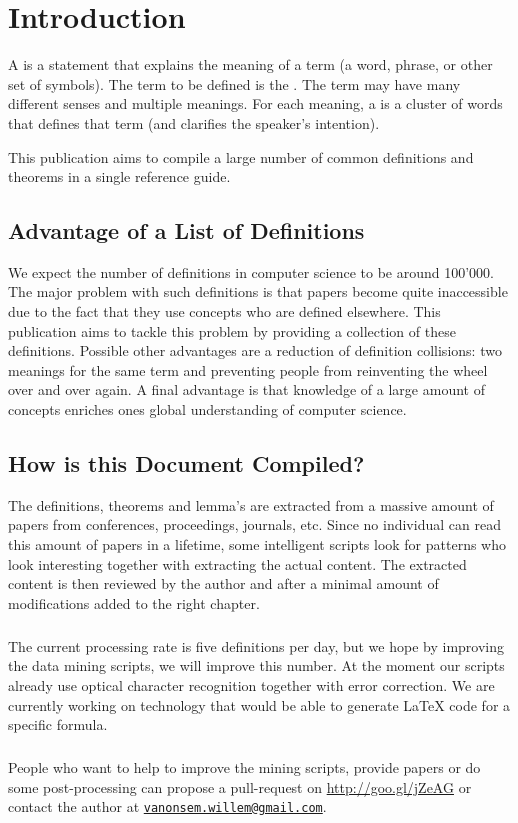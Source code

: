 \chapter*{Introduction}

\begin{defi}
A  is a statement that explains the meaning of a term (a word, phrase, or other set of symbols). The term to be defined is the . The term may have many different senses and multiple meanings. For each meaning, a  is a cluster of words that defines that term (and clarifies the speaker's intention).
\cite{wiki:definition}
\end{defi}

This publication aims to compile a large number of common definitions and theorems in a single reference guide.

\section*{Advantage of a List of Definitions}

We expect the number of definitions in computer science to be around 100'000. The major problem with such definitions is that papers become quite inaccessible due to the fact that they use concepts who are defined elsewhere. This publication aims to tackle this problem by providing a collection of these definitions. Possible other advantages are a reduction of definition collisions: two meanings for the same term and preventing people from reinventing the wheel over and over again. A final advantage is that knowledge of a large amount of concepts enriches ones global understanding of computer science.

\section*{How is this Document Compiled?}

The definitions, theorems and lemma's are extracted from a massive amount of papers from conferences, proceedings, journals, etc. Since no individual can read this amount of papers in a lifetime, some intelligent scripts look for patterns who look interesting together with extracting the actual content. The extracted content is then reviewed by the author and after a minimal amount of modifications added to the right chapter.
\paragraph{}
The current processing rate is five definitions per day, but we hope by improving the data mining scripts, we will improve this number. At the moment our scripts already use optical character recognition together with error correction. We are currently working on technology that would be able to generate \LaTeX{} code for a specific formula.
\paragraph{}
People who want to help to improve the mining scripts, provide papers or do some post-processing can propose a pull-request on \url{http://goo.gl/jZeAG} or contact the author at \href{mailto:vanonsem.willem@gmail.com}{\nolinkurl{vanonsem.willem@gmail.com}}.